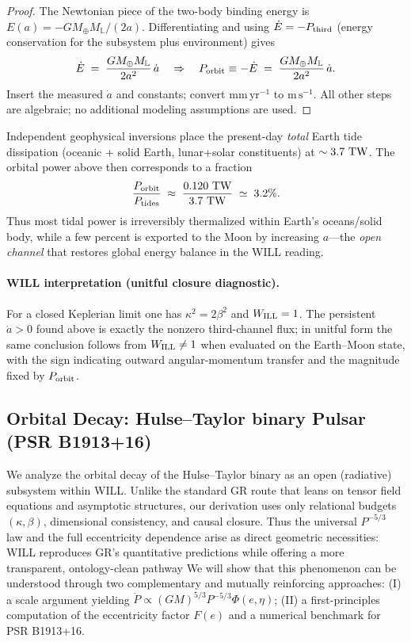 \documentclass[12pt, a4paper]{article}
\begin{document}
\begin{proof}
The Newtonian piece of the two-body binding energy is $E(a)=-G M_\oplus M_\mathbb{L}/(2a)$. Differentiating and using $\dot E = -P_{\rm third}$ (energy conservation for the subsystem plus environment) gives
\[
\dot E \;=\; \frac{G M_\oplus M_\mathbb{L}}{2a^{2}}\,\dot a
\quad\Rightarrow\quad
P_{\rm orbit}\equiv -\dot E \;=\; \frac{G M_\oplus M_\mathbb{L}}{2a^{2}}\,\dot a.
\]
Insert the measured $\dot a$ and constants; convert $\mathrm{mm\,yr^{-1}}$ to $\mathrm{m\,s^{-1}}$. All other steps are algebraic; no additional modeling assumptions are used.
\end{proof}

\begin{tcolorbox}[colback=gray!5,colframe=black!60,title=Comparison to global tidal dissipation]
Independent geophysical inversions place the present-day \emph{total} Earth tide dissipation (oceanic + solid Earth, lunar+solar constituents) at $\sim 3.7\ {\rm TW}$. The orbital power above then corresponds to a fraction
\[
\frac{P_{\rm orbit}}{P_{\rm tides}}\;\approx\; \frac{0.120\ {\rm TW}}{3.7\ {\rm TW}}\;\simeq\;3.2\%.
\]
Thus most tidal power is irreversibly thermalized within Earth’s oceans/solid body, while a few percent is exported to the Moon by increasing $a$---the \emph{open channel} that restores global energy balance in the WILL reading.
\end{tcolorbox}

\paragraph{WILL interpretation (unitful closure diagnostic).}
For a closed Keplerian limit one has $\kappa^{2}=2\beta^{2}$ and $W_{\rm ILL}=1$. The persistent $\dot a>0$ found above is exactly the nonzero third-channel flux; in unitful form the same conclusion follows from $W_{\rm ILL}\neq1$ when evaluated on the Earth–Moon state, with the sign indicating outward angular-momentum transfer and the magnitude fixed by $P_{\rm orbit}$.

\subsection{Orbital Decay: Hulse–Taylor binary Pulsar (PSR B1913+16)}

We analyze the orbital decay of the Hulse–Taylor binary as an open (radiative) subsystem within WILL. 
Unlike the standard GR route that leans on tensor field equations and asymptotic structures, our derivation uses only relational budgets $(\kappa,\beta)$, dimensional consistency, and causal closure. 
Thus the universal $P^{-5/3}$ law and the full eccentricity dependence arise as direct geometric necessities: WILL reproduces GR’s quantitative predictions while offering a more transparent, ontology-clean pathway We will show that this phenomenon can be understood through two complementary and mutually reinforcing approaches:
(I) a scale argument yielding $\dot P \propto (GM)^{5/3}P^{-5/3}\Phi(e,\eta)$; 
(II) a first-principles computation of the eccentricity factor $F(e)$ and a numerical benchmark for PSR B1913+16.
\end{document}
